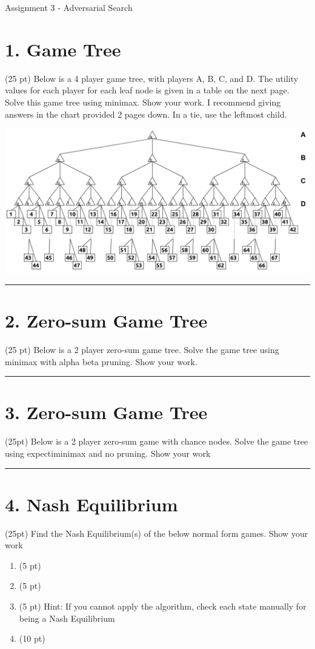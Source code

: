 \documentclass[11pt]{article}
\begin{document}
\begin{flushleft}
Assignment 3 - Adversarial Search

\section*{1. Game Tree}
(25 pt) Below is a 4 player game tree, with players A, B, C, and D. The utility
    values for each player for each leaf node is given in a table on the next
    page. Solve this game tree using minimax. Show your work. I recommend
    giving answers in the chart provided 2 pages down. In a tie, use the
    leftmost child.

\includegraphics[width=\textwidth]{Images/game_tree.png}

\rule{\textwidth}{0.5pt}

\section*{2. Zero-sum Game Tree}
(25 pt) Below is a 2 player zero-sum game tree. Solve the game tree using
    minimax with alpha beta pruning. Show your work.

\rule{\textwidth}{0.5pt}

\section*{3. Zero-sum Game Tree}
(25pt) Below is a 2 player zero-sum game with chance nodes. Solve the game tree
    using expectiminimax and no pruning. Show your work

\rule{\textwidth}{0.5pt}

\section*{4. Nash Equilibrium}
(25pt) Find the Nash Equilibrium(s) of the below normal form games. Show your
    work

\begin{enumerate}[label=\alph*.]
    \item (5 pt)
    \item (5 pt)
    \item (5 pt) Hint: If you cannot apply the algorithm, check each state
        manually for being a Nash Equilibrium
    \item (10 pt)
\end{enumerate}

\end{flushleft}
\end{document}
